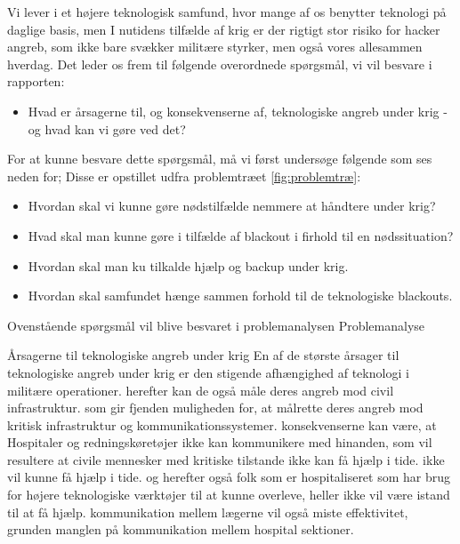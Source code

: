 Vi lever i et højere teknologisk samfund, hvor mange af os benytter teknologi på daglige basis, men I nutidens tilfælde af krig er der rigtigt stor risiko for hacker angreb, som ikke bare svækker militære styrker, men også vores allesammen hverdag.
Det leder os frem til følgende overordnede spørgsmål, vi vil besvare i rapporten:

\begin{itemize}
    \item Hvad er årsagerne til, og konsekvenserne af, teknologiske angreb under krig - og hvad kan vi gøre ved det?
\end{itemize}

For at kunne besvare dette spørgsmål, må vi først undersøge følgende som ses neden for; Disse er opstillet udfra problemtræet \ref{fig:problemtræ}:
\begin{itemize}
    \item Hvordan skal vi kunne gøre nødstilfælde nemmere at håndtere under krig?
    \item Hvad skal man kunne gøre i tilfælde af blackout i firhold til en nødssituation?
    \item Hvordan skal man ku tilkalde hjælp og backup under krig.
    \item Hvordan skal samfundet hænge sammen forhold til de teknologiske blackouts.
\end{itemize}

Ovenstående spørgsmål vil blive besvaret i problemanalysen
Problemanalyse

Årsagerne til teknologiske angreb under krig
En af de største årsager til teknologiske angreb under krig er den stigende afhængighed af teknologi i militære operationer.
herefter kan de også måle deres angreb mod civil infrastruktur. som gir fjenden muligheden for, at målrette deres angreb mod kritisk infrastruktur og kommunikationssystemer. konsekvenserne kan være, at Hospitaler og redningskøretøjer ikke kan kommunikere med hinanden, som vil resultere at civile mennesker med kritiske tilstande ikke kan få hjælp i tide.
ikke vil kunne få hjælp i tide. og herefter også folk som er hospitaliseret som har brug for højere teknologiske værktøjer til at kunne overleve, heller ikke vil være istand til at få hjælp. kommunikation mellem lægerne vil også miste effektivitet, grunden manglen på kommunikation mellem hospital sektioner.
